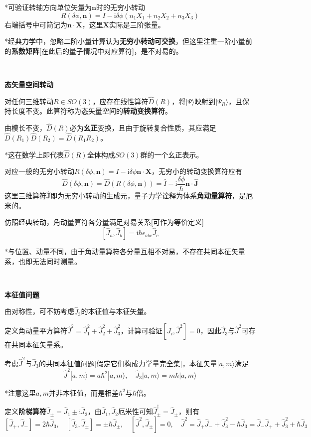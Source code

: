 \documentclass[a4paper,UTF8,fontset=windows]{ctexart}
\newcommand*{\ir}{\mathrm{i}}
\newcommand*{\ket}[1]{|#1\rangle}
\newcommand*{\bj}{\mathbf{J}}
\begin{document}
*可验证转轴方向单位矢量为$\mathbf{n}$时的无穷小转动
$$R(\delta\phi,\mathbf{n})=I-\ir\delta\phi(n_1X_1+n_2X_2+n_3X_3)$$
右端括号中可简记为$\mathbf{n}\cdot\mathbf{X}$，这里$\mathbf{X}$实际是三阶张量。

*经典力学中，忽略二阶小量计算认为\textbf{无穷小转动可交换}，但这里注重一阶小量前的\textbf{系数矩阵}[在此后的量子情况中对应算符]，是不对易的。

\

\textbf{态矢量空间转动}

对任何三维转动$R\in SO(3)$，应存在线性算符$\hat{D}(R)$，将$\ket{\Psi}$映射到$\ket{\Psi_R}$，且保持长度不变。此算符称为态矢量空间的\textbf{转动变换算符}。

由模长不变，$\hat{D}(R)$必为\textbf{幺正}变换，且由于旋转复合性质，其应满足$\hat{D}(R_1)\hat{D}(R_2)=\hat{D}(R_1R_2)$。

*这在数学上即代表$\hat{D}(R)$全体构成$SO(3)$群的一个幺正表示。

对应一般的无穷小转动$R(\delta\phi,\mathbf{n})=I-\ir\delta\phi\mathbf{n}\cdot\mathbf{X}$，无穷小的转动变换算符应有
$$\hat{D}(\delta\phi,\mathbf{n})=\hat{D}(R(\delta\phi,\mathbf{n}))=\hat{I}-\ir\frac{\delta\phi}{\hbar}\mathbf{n}\cdot\hat{\bj}$$
这里三维算符$\hat{\bj}$即为无穷小转动的生成元，量子力学诠释为体系\textbf{角动量算符}，是厄米的。

仿照经典转动，角动量算符各分量满足对易关系[可作为等价定义]
$$[\hat{J}_a,\hat{J}_b]=\ir\hbar\epsilon_{abc}\hat{J}_c$$

*与位置、动量不同，由于角动量算符各分量互相不对易，不存在共同本征矢量系，也即无法同时测量。

\

\textbf{本征值问题}

由对称性，可不妨考虑$\hat{J}_3$的本征值与本征矢量。

定义角动量平方算符$\hat{J}^2=\hat{J}_1^2+\hat{J}_2^2+\hat{J}_3^2$，计算可验证$[\hat{J}_i,\hat{J}^2]=0$，因此$\hat{J}_3$与$\hat{J}^2$可存在共同本征矢量系。

考虑$\hat{J}^2$与$\hat{J}_3$的共同本征值问题[假定它们构成力学量完全集]，本征矢量$\ket{a,m}$满足
$$\hat{J}^2\ket{a,m}=a\hbar^2\ket{a,m},\quad\hat{J}_3\ket{a,m}=m\hbar\ket{a,m}$$

*注意这里$a,m$并非本征值，而是相差$\hbar^2$与$\hbar$倍。

定义\textbf{阶梯算符}$\hat{J}_\pm=\hat{J}_1\pm\ir\hat{J}_2$，由$\hat{J}_1,\hat{J}_2$厄米性可知$\hat{J}_\pm^\dagger=\hat{J}_\pm$，则有
$$[\hat{J}_+,\hat{J}_-]=2\hbar\hat{J}_3,\quad[\hat{J}_3,\hat{J}_\pm]=\pm\hbar\hat{J}_\pm,\quad[\hat{J}^2,\hat{J}_\pm]=0,\quad\hat{J}^2=\hat{J}_+\hat{J}_-+\hat{J}_3^2-\hbar\hat{J}_3=\hat{J}_-\hat{J}_++\hat{J}_3^2+\hbar\hat{J}_3$$
\end{document}
